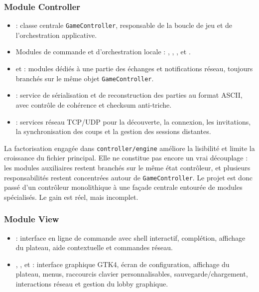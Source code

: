 \documentclass[a4paper]{article}
\begin{document}
\subsubsection{Module Controller}

\begin{itemize}
    \item {} : classe centrale \texttt{GameController}, responsable de la boucle de jeu et de l'orchestration applicative.
    \item Modules de commande et d'orchestration locale : , , ,  et .
    \item {} et  : modules dédiés à une partie des échanges et notifications réseau, toujours branchés sur le même objet \texttt{GameController}.
    \item {} : service de sérialisation et de reconstruction des parties au format ASCII, avec contrôle de cohérence et checksum anti-triche.
    \item {} : services réseau TCP/UDP pour la découverte, la connexion, les invitations, la synchronisation des coups et la gestion des sessions distantes.
\end{itemize}

La factorisation engagée dans \texttt{controller/engine} améliore la lisibilité et limite la croissance du fichier principal. Elle ne constitue pas encore un vrai découplage : les modules auxiliaires restent branchés sur le même état contrôleur, et plusieurs responsabilités restent concentrées autour de \texttt{GameController}. Le projet est donc passé d'un contrôleur monolithique à une façade centrale entourée de modules spécialisés. Le gain est réel, mais incomplet.

\subsubsection{Module View}

\begin{itemize}
    \item {} : interface en ligne de commande avec shell interactif, complétion, affichage du plateau, aide contextuelle et commandes réseau.
    \item {}, ,  et  : interface graphique GTK4, écran de configuration, affichage du plateau, menus, raccourcis clavier personnalisables, sauvegarde/chargement, interactions réseau et gestion du lobby graphique.
\end{itemize}
\end{document}
